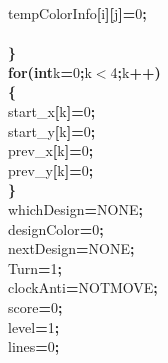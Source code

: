 \documentclass[a4paper, 10pt]{article}
\newcommand\SPC{\hspace*{0.6em}}
\newcommand{\CppAIdentifier}[1]{#1}
\newcommand{\CppANumber}[1]{\textcolor[rgb]{0.5,0,0.5}{#1}}
\newcommand{\CppAReservedWord}[1]{\textbf{#1}}
\newcommand{\CppASpace}[1]{\colorbox[rgb]{1,1,1}{#1}}
\newcommand{\CppASymbol}[1]{\textbf{\textcolor[rgb]{1,0,0}{#1}}}
\begin{document}
\begin{ttfamily}
\CppASpace{\SPC \SPC \SPC }\CppAIdentifier{tempColorInfo}\CppASymbol{[}\CppAIdentifier{i}\CppASymbol{]}\CppASymbol{[}\CppAIdentifier{j}\CppASymbol{]}\CppASymbol{=}\CppANumber{0}\CppASymbol{;}\\
\\
\CppASpace{\SPC \SPC }\CppASymbol{\}}\\
\CppASpace{\SPC }\CppAReservedWord{for}\CppASymbol{(}\CppAReservedWord{int}\CppASpace{\SPC }\CppAIdentifier{k}\CppASymbol{=}\CppANumber{0}\CppASymbol{;}\CppAIdentifier{k}\CppASymbol{$<$}\CppANumber{4}\CppASymbol{;}\CppAIdentifier{k}\CppASymbol{++}\CppASymbol{)}\\
\CppASpace{\SPC }\CppASymbol{\{}\\
\CppASpace{\SPC \SPC }\CppAIdentifier{start\_x}\CppASymbol{[}\CppAIdentifier{k}\CppASymbol{]}\CppASymbol{=}\CppANumber{0}\CppASymbol{;}\\
\CppASpace{\SPC \SPC }\CppAIdentifier{start\_y}\CppASymbol{[}\CppAIdentifier{k}\CppASymbol{]}\CppASymbol{=}\CppANumber{0}\CppASymbol{;}\\
\CppASpace{\SPC \SPC }\CppAIdentifier{prev\_x}\CppASymbol{[}\CppAIdentifier{k}\CppASymbol{]}\CppASymbol{=}\CppANumber{0}\CppASymbol{;}\\
\CppASpace{\SPC \SPC }\CppAIdentifier{prev\_y}\CppASymbol{[}\CppAIdentifier{k}\CppASymbol{]}\CppASymbol{=}\CppANumber{0}\CppASymbol{;}\\
\CppASpace{\SPC }\CppASymbol{\}}\\
\CppASpace{\SPC }\CppAIdentifier{whichDesign}\CppASymbol{=}\CppAIdentifier{NONE}\CppASymbol{;}\\
\CppASpace{\SPC }\CppAIdentifier{designColor}\CppASymbol{=}\CppANumber{0}\CppASymbol{;}\\
\CppASpace{\SPC }\CppAIdentifier{nextDesign}\CppASymbol{=}\CppAIdentifier{NONE}\CppASymbol{;}\\
\CppASpace{\SPC }\CppAIdentifier{Turn}\CppASymbol{=}\CppANumber{1}\CppASymbol{;}\\
\CppASpace{\SPC }\CppAIdentifier{clockAnti}\CppASpace{\SPC }\CppASymbol{=}\CppASpace{\SPC }\CppAIdentifier{NOTMOVE}\CppASymbol{;}\\
\CppASpace{\SPC }\CppAIdentifier{score}\CppASymbol{=}\CppANumber{0}\CppASymbol{;}\\
\CppASpace{\SPC }\CppAIdentifier{level}\CppASymbol{=}\CppANumber{1}\CppASymbol{;}\\
\CppASpace{\SPC }\CppAIdentifier{lines}\CppASymbol{=}\CppANumber{0}\CppASymbol{;}\\
\\

\end{ttfamily}
\end{document}
